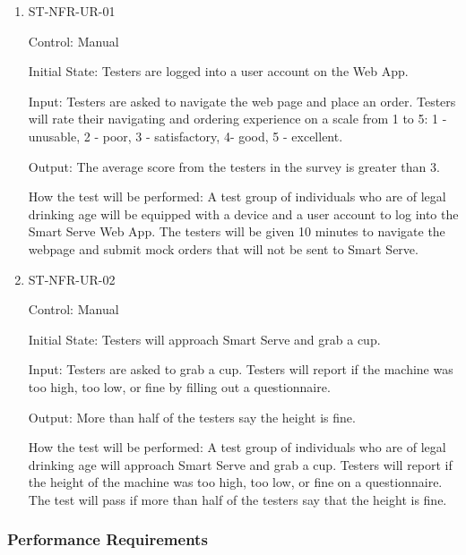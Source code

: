 \documentclass[12pt, titlepage]{article}
\begin{document}
\begin{enumerate}

\item{ST-NFR-UR-01\\}

Control: Manual

Initial State: Testers are logged into a user account on the Web App.

Input: Testers are asked to navigate the web page and place an order. Testers will rate their navigating and ordering experience on a scale from 1 to 5: 1 - unusable, 2 - poor, 3 - satisfactory, 4- good, 5 - excellent.

Output: The average score from the testers in the survey is greater than 3.

How the test will be performed: A test group of individuals who are of legal drinking age will be equipped with a device and a user account to log into the Smart Serve Web App. The testers will be given 10 minutes to navigate the webpage and submit mock orders that will not be sent to Smart Serve.

\item{ST-NFR-UR-02\\}

Control: Manual

Initial State: Testers will approach Smart Serve and grab a cup.

Input: Testers are asked to grab a cup. Testers will report if the machine was too high, too low, or fine by filling out a questionnaire.

Output:  More than half of the testers say the height is fine.

How the test will be performed: A test group of individuals who are of legal drinking age will approach Smart Serve and grab a cup. Testers will report if the height of the machine was too high, too low, or fine on a questionnaire. The test will pass if more than half of the testers say that the height is fine.

\end{enumerate}

\subsubsection{Performance Requirements}
\end{document}
